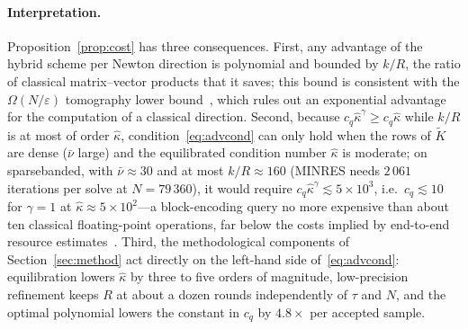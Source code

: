 \documentclass[11pt]{article}
\theoremstyle{definition}
\newcommand{\Kt}{\tilde K}
\newcommand{\kh}{\hat\kappa}
\newcommand{\eps}{\varepsilon}
\newcommand{\dsus}{\textunderscore\penalty5000\hskip0pt\relax}
\newcommand{\ds}[1]{{\ttfamily\let\_\dsus#1}}
\begin{document}
\paragraph{Interpretation.} Proposition~\ref{prop:cost} has three consequences. First, any advantage of the hybrid scheme per Newton direction is polynomial and bounded by $k/R$, the ratio of classical matrix--vector products that it saves; this bound is consistent with the $\Omega(N/\eps)$ tomography lower bound~\cite{vanapeldoorn2023tomography}, which rules out an exponential advantage for the computation of a classical direction. Second, because $c_q\kh^{\gamma}\ge c_q\kh$ while $k/R$ is at most of order $\kh$, condition~\eqref{eq:advcond} can only hold when the rows of $\Kt$ are dense ($\bar\nu$ large) and the equilibrated condition number $\kh$ is moderate; on \ds{sparse\_banded}, with $\bar\nu\approx30$ and at most $k/R\approx160$ (MINRES needs $2\,061$ iterations per solve at $N=79\,360$), it would require $c_q\kh^{\gamma}\lesssim5\times10^{3}$, i.e.\ $c_q\lesssim10$ for $\gamma=1$ at $\kh\approx5\times10^{2}$---a block-encoding query no more expensive than about ten classical floating-point operations, far below the costs implied by end-to-end resource estimates~\cite{dalzell2023endtoend}. Third, the methodological components of Section~\ref{sec:method} act directly on the left-hand side of~\eqref{eq:advcond}: equilibration lowers $\kh$ by three to five orders of magnitude, low-precision refinement keeps $R$ at about a dozen rounds independently of $\tau$ and $N$, and the optimal polynomial lowers the constant in $c_q$ by $4.8\times$ per accepted sample.
\end{document}
